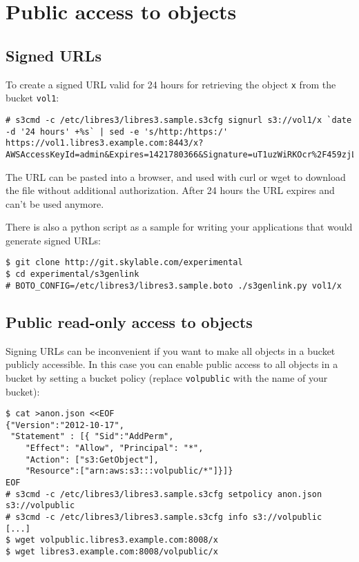 \chapter{Public access to objects}
\section{Signed URLs}

To create a signed URL valid for 24 hours for retrieving the object \verb|x| from the bucket \verb|vol1|:
\begin{lstlisting}
# s3cmd -c /etc/libres3/libres3.sample.s3cfg signurl s3://vol1/x `date -d '24 hours' +%s` | sed -e 's/http:/https:/'
https://vol1.libres3.example.com:8443/x?AWSAccessKeyId=admin&Expires=1421780366&Signature=uT1uzWiRKOcr%2F459zjLvmWoMTSg%3D
\end{lstlisting}

The URL can be pasted into a browser, and used with curl or wget to download the file without additional authorization. After 24 hours the URL expires and can't be used anymore.

There is also a python script as a sample for writing your applications that
would generate signed URLs:
\begin{lstlisting}
$ git clone http://git.skylable.com/experimental
$ cd experimental/s3genlink
# BOTO_CONFIG=/etc/libres3/libres3.sample.boto ./s3genlink.py vol1/x
\end{lstlisting}

\section{Public read-only access to objects}

Signing URLs can be inconvenient if you want to make all objects in a bucket
publicly accessible.
In this case you can enable public access to all objects in a bucket by setting
a bucket policy (replace \verb|volpublic| with the name of your bucket):
\begin{lstlisting}
$ cat >anon.json <<EOF
{"Version":"2012-10-17",
 "Statement" : [{ "Sid":"AddPerm",
    "Effect": "Allow", "Principal": "*",
    "Action": ["s3:GetObject"],
    "Resource":["arn:aws:s3:::volpublic/*"]}]}
EOF
# s3cmd -c /etc/libres3/libres3.sample.s3cfg setpolicy anon.json s3://volpublic
# s3cmd -c /etc/libres3/libres3.sample.s3cfg info s3://volpublic
[...]
$ wget volpublic.libres3.example.com:8008/x
$ wget libres3.example.com:8008/volpublic/x
\end{lstlisting}

